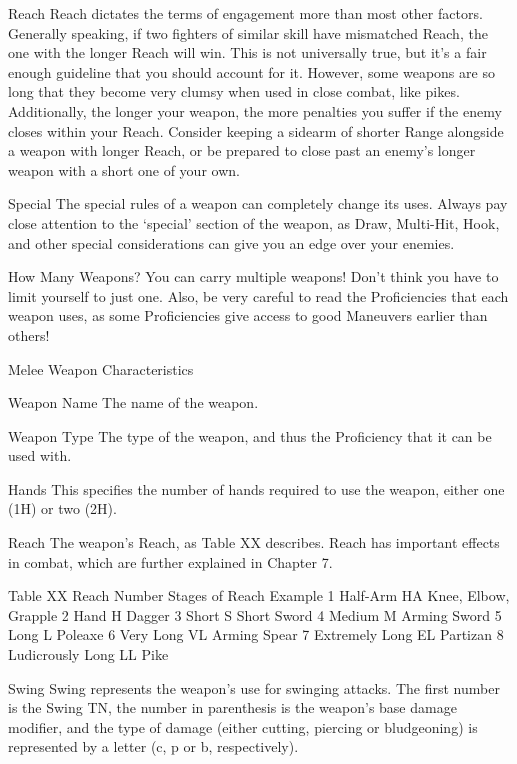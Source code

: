\documentclass[oneside,11pt,english]{book}
\begin{document}
 

Reach 
Reach dictates the terms of engagement more than most other factors. Generally speaking, if two fighters 
of similar skill have mismatched Reach, the one with the longer Reach will win. This is not universally 
true, but it’s a fair enough guideline that you should account for it. However, some weapons are so long 
that they become very clumsy when used in close combat, like pikes. Additionally, the longer your 
weapon, the more penalties you suffer if the enemy closes within your Reach. Consider keeping a sidearm 
of shorter Range alongside a weapon with longer Reach, or be prepared to close past an enemy’s longer 
weapon with a short one of your own. 

 

Special 
The special rules of a weapon can completely change its uses. Always pay close attention to the ‘special’ 
section of the weapon, as Draw, Multi-Hit, Hook, and other special considerations can give you an edge 
over your enemies. 

 


How Many Weapons? 
You can carry multiple weapons! Don’t think you have to limit yourself to just one. Also, be very careful 
to read the Proficiencies that each weapon uses, as some Proficiencies give access to good Maneuvers 
earlier than others! 

 

Melee Weapon Characteristics 

 

Weapon Name 
The name of the weapon. 

 

Weapon Type 
The type of the weapon, and thus the Proficiency that it can be used with. 

 

Hands 
This specifies the number of hands required to use the weapon, either one (1H) or two (2H). 

 

Reach 
The weapon’s Reach, as Table XX describes. Reach has important effects in combat, which are further 
explained in Chapter 7. 

 
Table XX Reach 
Number Stages of Reach Example 
1 Half-Arm HA Knee, Elbow, Grapple 
2 Hand H Dagger 
3 Short S Short Sword 
4 Medium M Arming Sword 
5 Long L Poleaxe 
6 Very Long VL Arming Spear 
7 Extremely Long EL Partizan 
8 Ludicrously Long LL Pike 

 

Swing 
Swing represents the weapon’s use for swinging attacks. The first number is the Swing TN, the number in 
parenthesis is the weapon’s base damage modifier, and the type of damage (either cutting, piercing or 
bludgeoning) is represented by a letter (c, p or b, respectively). 
\end{document}
